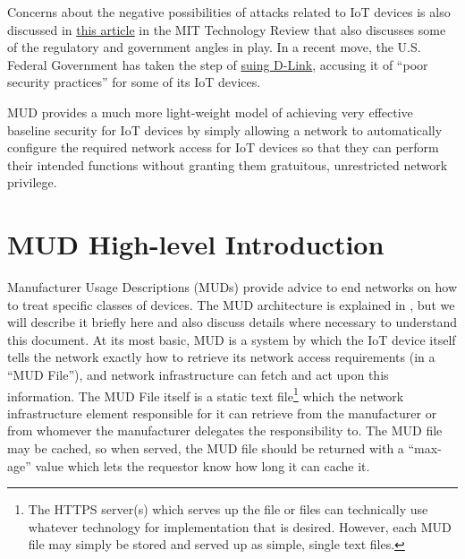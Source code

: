 \documentclass[conference]{IEEEtran}
\begin{document}
Concerns about the negative possibilities of attacks related to IoT
devices is also discussed in
\href{https://www.technologyreview.com/s/603015/security-experts-warn-congress-that-the-internet-of-things-could-kill-people/}{this
article} in the MIT Technology Review
that also discusses some of
the regulatory and government angles in play.  In a recent move, the
U.S. Federal Government has taken the step of
\href{https://www.cnet.com/news/d-link-lawsuit-ftc-security-hackers/}{suing
  D-Link}, accusing it of ``poor security practices'' for some of its
IoT devices.

MUD provides a much more light-weight model of achieving very
effective baseline security for IoT devices by simply allowing a
network to automatically configure the required network access for IoT
devices so that they can perform their intended functions without
granting them gratuitous, unrestricted network privilege.

\section{MUD High-level Introduction}
Manufacturer Usage Descriptions (MUDs) provide advice to end networks
on how to treat specific classes of devices.  The MUD architecture is
explained in \cite{I-D:ietf-opsawg-mud}, but we will describe it
briefly here and also discuss details where necessary to understand
this document.  At its most basic, MUD is a system by which the IoT
device itself tells the network exactly how to retrieve its network
access requirements (in a ``MUD File''), and network infrastructure
can fetch and act upon this information.  The MUD File itself is a
static text file\footnote{The HTTPS server(s) which serves up the file
  or files can technically use whatever technology for implementation
  that is desired.  However, each MUD file may simply be stored and
  served up as simple, single text files.} which the network
infrastructure element responsible for it can retrieve from the
manufacturer or from whomever the manufacturer delegates the
responsibility to.  The MUD file may be cached, so when served, the
MUD file should be returned with a ``max-age'' value which lets the
requestor know how long it can cache it.
\end{document}
